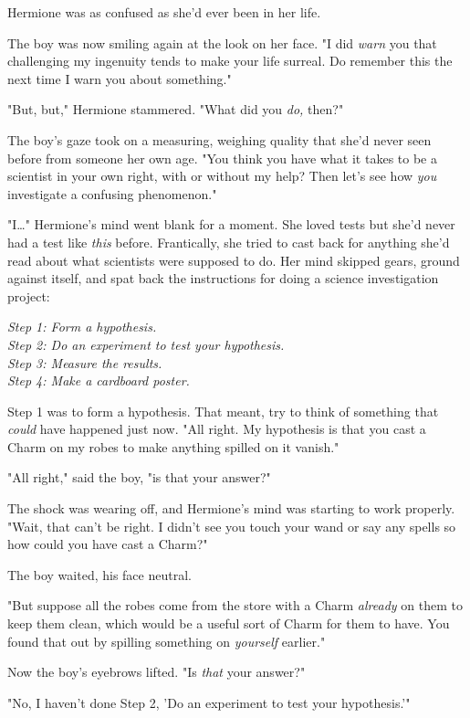 Hermione was as confused as she'd ever been in her life.

The boy was now smiling again at the look on her face. "I did \emph{warn} you 
that challenging my ingenuity tends to make your life surreal. Do remember this 
the next time I warn you about something."

"But, but," Hermione stammered. "What did you \emph{do,} then?"

The boy's gaze took on a measuring, weighing quality that she'd never seen 
before from someone her own age. "You think you have what it takes to be a 
scientist in your own right, with or without my help? Then let's see how 
\emph{you} investigate a confusing phenomenon."

"I{\ldots}" Hermione's mind went blank for a moment. She loved tests but she'd 
never had a test like \emph{this} before. Frantically, she tried to cast back 
for anything she'd read about what scientists were supposed to do. Her mind 
skipped gears, ground against itself, and spat back the instructions for doing 
a science investigation project:

\emph{Step 1: Form a hypothesis.\\
Step 2: Do an experiment to test your hypothesis.\\
Step 3: Measure the results.\\
Step 4: Make a cardboard poster.}

Step 1 was to form a hypothesis. That meant, try to think of something that 
\emph{could} have happened just now. "All right. My hypothesis is that you cast 
a Charm on my robes to make anything spilled on it vanish."

"All right," said the boy, "is that your answer?"

The shock was wearing off, and Hermione's mind was starting to work properly. 
"Wait, that can't be right. I didn't see you touch your wand or say any spells 
so how could you have cast a Charm?"

The boy waited, his face neutral.

"But suppose all the robes come from the store with a Charm \emph{already} on 
them to keep them clean, which would be a useful sort of Charm for them to 
have. You found that out by spilling something on \emph{yourself} earlier."

Now the boy's eyebrows lifted. "Is \emph{that} your answer?"

"No, I haven't done Step 2, 'Do an experiment to test your hypothesis.'"

